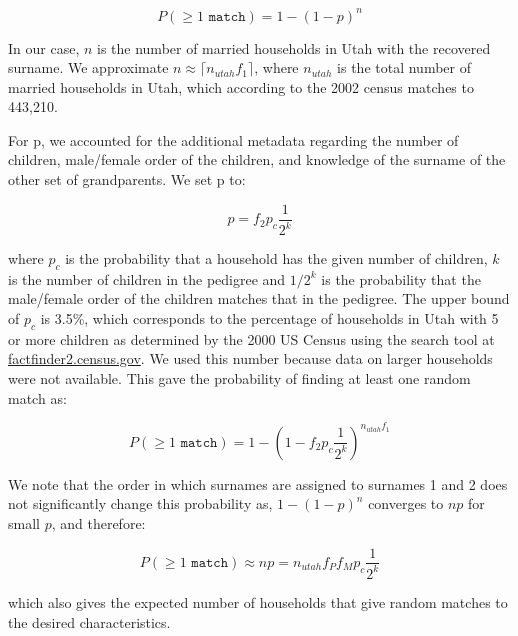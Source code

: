 \begin{equation}
\label{eq:sureq7}
P(\geq 1 \texttt{ match}) = 1-(1-p)^n
\end{equation}

In our case, $n$ is the number of married households in Utah with the recovered surname. We approximate $n \approx \lceil n_{utah}f_1 \rceil$, where $n_{utah}$ is the total number of married households in Utah, which according to the 2002 census matches to 443,210. 

For p, we accounted for the additional metadata regarding the number of children, male/female order of the children, and knowledge of the surname of the other set of grandparents. We set p to:

\begin{equation}
\label{eq:sureq8}
p = f_2p_c \frac{1}{2^k}
\end{equation}

where $p_c$ is the probability that a household has the given number of children, $k$ is the number of children in the pedigree and $1/2^k$  is the probability that the male/female order of the children matches that in the pedigree. The upper bound of $p_c$ is 3.5\%, which corresponds to the percentage of households in Utah with 5 or more children as determined by the 2000 US Census using the search tool at \url{factfinder2.census.gov}. We used this number because data on larger households were not available. This gave the probability of finding at least one random match as:

\begin{equation}
\label{eq:sureq9}
P(\geq 1 \texttt{ match}) = 1-(1-f_2p_c\frac{1}{2^k})^{n_{utah}f_1}
\end{equation}

We note that the order in which surnames are assigned to surnames 1 and 2 does not significantly change this probability as, $1-(1-p)^n$ converges to $np$ for small $p$, and therefore:

\begin{equation}
\label{eq:sureq10}
P(\geq 1 \texttt{ match}) \approx np = n_{utah}f_Pf_Mp_c\frac{1}{2^k}
\end{equation}

which also gives the expected number of households that give random matches to the desired characteristics. 

